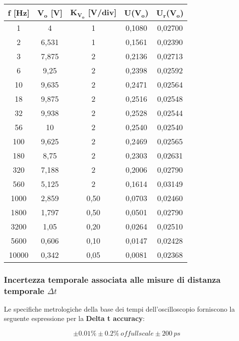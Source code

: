 \begin{table}[!ht]
    \centering
    \begin{tabular}{|c|c|c|c|c|}
    \hline
        \textbf{f [Hz]} & \textbf{$\bm{V_{o}}$ [V]} & \textbf{$\bm{K_{V_o}}$ [V/div]} & \textbf{U($\bm{V_{o}}$)} & \textbf{$\bm{U_r}$($\bm{V_{o}}$)} \\ \hline
        1 & 4 & 1 & 0,1080 & 0,02700 \\ \hline
        2 & 6,531 & 1 & 0,1561 & 0,02390 \\ \hline
        3 & 7,875 & 2 & 0,2136 & 0,02713 \\ \hline
        6 & 9,25 & 2 & 0,2398 & 0,02592 \\ \hline
        10 & 9,635 & 2 & 0,2471 & 0,02564 \\ \hline
        18 & 9,875 & 2 & 0,2516 & 0,02548 \\ \hline
        32 & 9,938 & 2 & 0,2528 & 0,02544 \\ \hline
        56 & 10 & 2 & 0,2540 & 0,02540 \\ \hline
        100 & 9,625 & 2 & 0,2469 & 0,02565 \\ \hline
        180 & 8,75 & 2 & 0,2303 & 0,02631 \\ \hline
        320 & 7,188 & 2 & 0,2006 & 0,02790 \\ \hline
        560 & 5,125 & 2 & 0,1614 & 0,03149 \\ \hline
        1000 & 2,859 & 0,50 & 0,0703 & 0,02460 \\ \hline
        1800 & 1,797 & 0,50 & 0,0501 & 0,02790 \\ \hline
        3200 & 1,05 & 0,20 & 0,0264 & 0,02510 \\ \hline
        5600 & 0,606 & 0,10 & 0,0147 & 0,02428 \\ \hline
        10000 & 0,342 & 0,05 & 0,0081 & 0,02368 \\ \hline
    \end{tabular}
\end{table}

\FloatBarrier
\clearpage

\subsubsection{Incertezza temporale associata alle misure di distanza temporale $\Delta t$}
Le specifiche metrologiche della base dei tempi dell'oscilloscopio forniscono la seguente espressione per la \textbf{Delta t accuracy}:

\[\pm0.01\% \pm0.2\% \ of full scale \pm 200 \ ps\]

